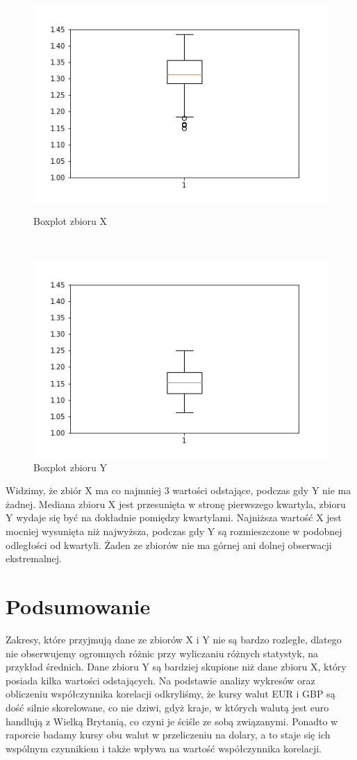 \documentclass[12pt]{mwart}
\begin{document}
	\begin{figure}[H]
		\begin{minipage}{.5\linewidth}
			\centering
			\includegraphics[scale=0.7]{X_box.PNG}
			\caption{Boxplot zbioru X}
		\end{minipage}
		$\quad$
		\begin{minipage}{.5\linewidth}
			\centering
			\includegraphics[scale=0.7]{Y_box.PNG}
			\caption{Boxplot zbioru Y}
		\end{minipage}
	\end{figure}
\noindent Widzimy, że zbiór X ma co najmniej 3 wartości odstające, podczas gdy Y nie ma żadnej. Mediana zbioru X jest przesunięta w stronę pierwszego kwartyla, zbioru Y wydaje się być na dokładnie pomiędzy kwartylami. Najniższa wartość X jest mocniej wysunięta niż najwyższa, podczas gdy Y są rozmieszczone w podobnej odległości od kwartyli. Żaden ze zbiorów nie ma górnej ani dolnej obserwacji ekstremalnej.
	\section{Podsumowanie}
	\noindent Zakresy, które przyjmują dane ze zbiorów X i Y nie są bardzo rozległe, dlatego nie obserwujemy ogromnych różnic przy wyliczaniu różnych statystyk, na przykład średnich.
	Dane zbioru Y są bardziej skupione niż dane zbioru X, który posiada kilka wartości odstających.  Na podstawie analizy wykresów oraz obliczeniu współczynnika korelacji odkryliśmy, że kursy walut EUR i GBP są dość silnie skorelowane, co nie dziwi, gdyż kraje, w których walutą jest euro handlują z Wielką Brytanią, co czyni je ściśle ze sobą związanymi. Ponadto w raporcie badamy kursy obu walut w przeliczeniu na dolary, a to staje się ich wspólnym czynnikiem i także wpływa na wartość współczynnika korelacji.
\end{document}
